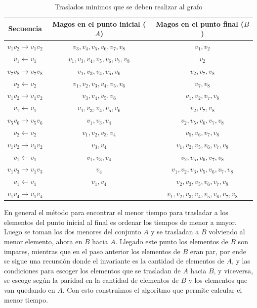 \documentclass[letterpaper,10pt,table, dvipsnames]{article}
\begin{document}
\begin{table}[htbp]
  \centering
  \caption{Traslados minimos que se deben realizar al grafo}
\begin{tabular}{|c||c||c|}\hline
Secuencia & Magos en el punto inicial ($A$) & Magos en el punto final ($B$) \\\hline 
    $v_1v_2 \rightarrow v_1v_2$ & $v_3,v_4,v_5,v_6,v_7,v_8$     & $v_1,v_2$ \\\hline
  $  v_1 \leftarrow v_1$        & $v_1,v_3,v_4,v_5,v_6,v_7,v_8$ & $v_2$ \\\hline
    $v_7v_8 \rightarrow v_7v_8$ & $v_1,v_3,v_4,v_5,v_6$         & $v_2,v_7,v_8$ \\\hline
  $  v_2 \leftarrow v_2 $       & $v_1,v_2,v_3,v_4,v_5,v_6$     & $v_7,v_8$ \\\hline
    $v_1v_2 \rightarrow v_1v_2$ & $v_3,v_4,v_5,v_6$             & $v_1,v_2,v_7,v_8$ \\\hline
  $  v_1 \leftarrow v_1 $       & $v_1,v_3,v_4,v_5,v_6$         & $v_2,v_7,v_8$ \\\hline
    $v_5v_6 \rightarrow v_5v_6$ & $v_1,v_3,v_4$                 & $v_2,v_5,v_6,v_7,v_8$ \\\hline
  $  v_2 \leftarrow v_2 $       & $v_1,v_2,v_3,v_4$             & $v_5,v_6,v_7,v_8$ \\\hline
    $v_1v_2 \rightarrow v_1v_2$ & $v_3,v_4$                     & $v_1,v_2,v_5,v_6,v_7,v_8$ \\\hline
  $  v_1 \leftarrow v_1 $       & $v_1,v_3,v_4$                 & $v_2,v_5,v_6,v_7,v_8$ \\\hline
    $v_1v_3 \rightarrow v_1v_3$ & $v_4$                         & $v_1,v_2,v_3,v_5,v_6,v_7,v_8$ \\\hline
  $  v_1 \leftarrow v_1 $       & $v_1,v_4$                     & $v_2,v_3,v_5,v_6,v_7,v_8$ \\\hline
    $v_1v_4 \rightarrow v_1v_4$ &                               & $v_1,v_2,v_3,v_4,v_5,v_6,v_7,v_8$ \\\hline
\end{tabular}
\label{tab:minimo}
\end{table}

En general el método para encontrar el menor tiempo para trasladar a los elementos del punto inicial al final es ordenar los tiempos de menor a mayor. Luego se toman los dos menores del conjunto $A$ y se trasladan a $B$ volviendo al menor elemento, ahora en $B$ hacia $A$. Llegado este punto los elementos de $B$ son impares, mientras que en el paso anterior los elementos de $B$ eran par, por ende se sigue una recursión donde el invariante es la cantidad de elementos de $A$, y las condiciones para escoger los elementos que se trasladan de $A$ hacia $B$, y viceversa, se escoge según la paridad en la cantidad de elementos de $B$ y los elementos que van quedando en $A$. Con esto construimos el algoritmo que permite calcular el menor tiempo.\\
\end{document}
